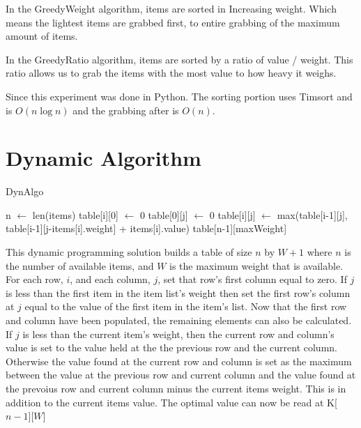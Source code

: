 \documentclass[10pt, letterpaper]{article}
\begin{document}
In the GreedyWeight algorithm, items are sorted in Increasing weight. Which means the lightest items are grabbed first, to entire grabbing of the maximum amount of items.

In the GreedyRatio algorithm, items are sorted by a ratio of value / weight. This ratio allows us to grab the items with the most value to how heavy it weighs.

Since this experiment was done in Python. The sorting portion uses Timsort and is $O(n \log n)$ and the grabbing after is $O(n)$.

\section{Dynamic Algorithm}
\begin{algorithm}[!htp]
  \begin{algorithmic}
    \caption{DynAlgo}\label{DynAlgo}
    \State n $\gets$ len(items)
    \State table[i][0] $\gets$ 0
    \State table[0][j] $\gets$ 0
    \EndIf
    \State table[i][j] $\gets$ max(table[i-1][j], table[i-1][j-items[i].weight] + items[i].value)
    \EndIf
    \EndFor
    \EndFor
    \Return table[n-1][maxWeight]
    \EndFunction
  \end{algorithmic}
\end{algorithm}

This dynamic programming solution builds a table of size $n$ by $W+1$ where $n$ is the number of available items, and $W$ is the maximum weight that is available. For each row, $i$, and each column, $j$,  set that row's first column equal to zero. If $j$ is less than the first item in the item list's weight then set the first row's column at $j$ equal to the value of the first item in the item's list.
Now that the first row and column have been populated, the remaining elements can also be calculated.
If $j$ is less than the current item's weight, then the current row and column's value is set to the value held at the the previous row and the current column. Otherwise the value found at the current row and column is set as the maximum between the value at the previous row and current column and the value found at the prevoius row and current column minus the current items weight. This is in addition to the current items value. The optimal value can now be read at K[$n-1$][$W$]
\end{document}
